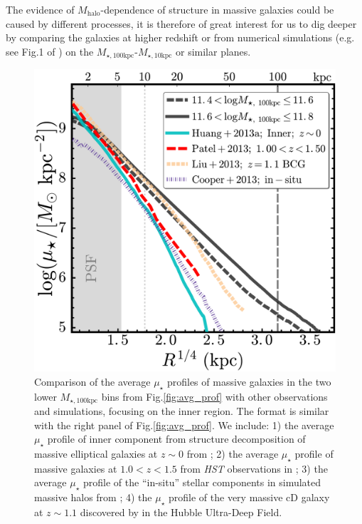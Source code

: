 \documentclass{emulateapj}
\def\mhalo{{$M_{\mathrm{halo}}$}}
\def\minn{{$M_{\star,10\mathrm{kpc}}$}}
\def\mtot{{$M_{\star,100\mathrm{kpc}}$}}
\def\mden{{$\mu_{\star}$}}
\begin{document}
\begin{CJK*}{UTF8}{gbsn}
    The evidence of \mhalo{}-dependence of structure in massive galaxies could be caused 
    by different processes, it is therefore of great interest for us to dig deeper by 
    comparing the galaxies at higher redshift or from numerical simulations (e.g. see 
    Fig.1 of \citealt{Wellons2016b}) on the \mtot{}-\minn{} or similar planes.
     

  \begin{figure}[bt!]
      \centering 
      \includegraphics[width=\columnwidth]{fig/redbcg_discussion_1}
      \caption{Comparison of the average \mden{} profiles of massive galaxies in the 
          two lower \mtot{} bins from Fig.\ref{fig:avg_prof} with other observations 
          and simulations, focusing on the inner region. 
          The format is similar with the right panel of Fig.\ref{fig:avg_prof}.
          We include: 
          1) the average \mden{} profile of inner component from structure 
          decomposition of massive elliptical galaxies at $z\sim 0$ from 
          \citet[][Cyan, solid]{Huang2013a}; 
          2) the average \mden{} profile of massive galaxies at $1.0 < z < 1.5$ 
          from \textit{HST} observations in \citet[][Red, dashed]{Patel2013}; 
          3) the average \mden{} profile of the ``in-situ'' stellar components in 
          simulated massive halos from \citet[][Purple, dot-dashed]{Cooper13};
          4) the \mden{} profile of the very massive cD galaxy at $z\sim 1.1$ 
          discovered by \citet[][Yellow, dashed]{Liu2013} in the Hubble 
          Ultra-Deep Field.}
      \label{fig:discussion_1}
  \end{figure}


\end{CJK*}
\end{document}
